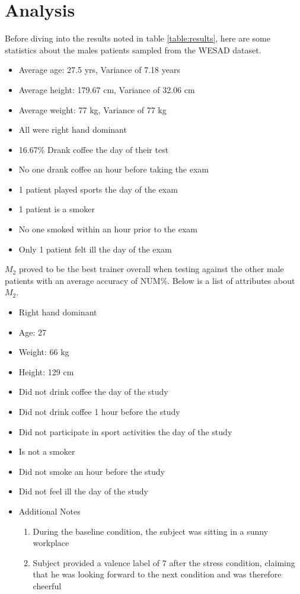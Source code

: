 \section{Analysis}
\label{sec:analysis}

Before diving into the results noted in table \ref{table:results}, here are some 
statistics about the males patients sampled from the WESAD dataset.

\begin{itemize}
	\item Average age: 27.5 yrs, Variance of 7.18 years
	\item Average height: 179.67 cm, Variance of 32.06 cm
	\item Average weight: 77 kg, Variance of 77 kg
	\item All were right hand dominant
	\item 16.67\% Drank coffee the day of their test
	\item No one drank coffee an hour before taking the exam
	\item 1 patient played sports the day of the exam
	\item 1 patient is a smoker
	\item No one smoked within an hour prior to the exam
	\item Only 1 patient felt ill the day of the exam
\end{itemize}
\bigskip 
$M_2$ proved to be the best trainer overall when testing against the other male patients 
with an average accuracy of NUM\%. Below is a list of attributes about $M_2$.

\begin{itemize}
	\item Right hand dominant
	\item Age: 27
	\item Weight: 66 kg
	\item Height: 129 cm
	\item Did not drink coffee the day of the study
	\item Did not drink coffee 1 hour before the study
	\item Did not participate in sport activities the day of the study
	\item Is not a smoker
	\item Did not smoke an hour before the study
	\item Did not feel ill the day of the study
	\item Additional Notes
	\begin{enumerate}
		\item During the baseline condition, the subject was sitting in a sunny workplace
		\item Subject provided a valence label of 7 after the stress condition, claiming that he was looking forward to the next condition and was therefore cheerful
	\end{enumerate}
\end{itemize}

